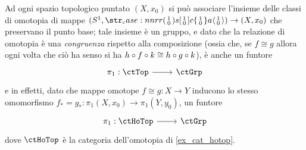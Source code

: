 \begin{example}\label{fun_ex_omoto_omolo}
	Ad ogni spazio topologico puntato \((X,x_0)\) si può associare l'insieme delle classi di omotopia di mappe \((S^1, \copmap[r] 10)\to (X, x_0)\) che preservano il punto base; tale insieme è un gruppo, e dato che la relazione di omotopia è una \emph{congruenza} rispetto alla composizione (ossia che, se \(f\cong g\) allora ogni volta che ciò ha senso si ha \(h\circ f\circ k\cong h\circ g\circ k\)), è anche un funtore
	\[\dmFun{\pi_1}\ctTop\ctGrp\]
	e in effetti, dato che mappe omotope \(f\cong g : X\to Y\) inducono lo stesso omomorfismo \(f_* = g_* : \pi_1(X,x_0) \to \pi_1(Y,y_0)\), un funtore
	\[\dmFun{\pi_1}\ctHoTop\ctGrp\]
	dove \(\ctHoTop\) è la categoria dell'omotopia di \ref{ex_cat_hotop}.


\end{example}
